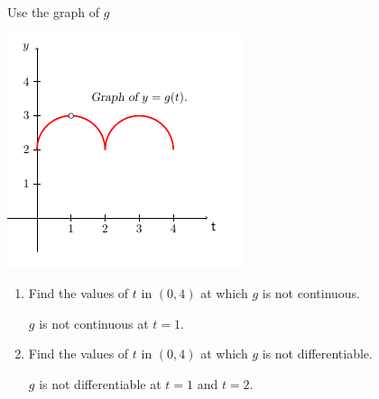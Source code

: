 \documentclass[nooutcomes,handout]{ximera}
\begin{document}
\begin{problem}
  Use the graph of $g$
			\begin{image}
	 		\includegraphics{Figure3.png}
			\end{image}
			

	\begin{enumerate}
	
	\item Find the values of $t$ in $(0,4)$ at which $g$ is not continuous.
		\begin{freeResponse}
		$g$ is not continuous at $t=1$.
		\end{freeResponse}
		
		
	
	\item Find the values of $t$ in $(0,4)$ at which $g$ is not differentiable.
		\begin{freeResponse}
		$g$ is not differentiable at $t=1$ and $t=2$.
		\end{freeResponse}
		
		\end{enumerate}



\end{problem}
	
\end{document}
